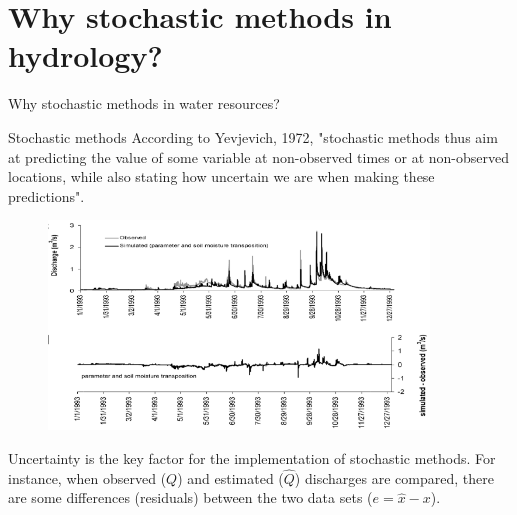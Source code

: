\documentclass[8pt]{beamer}
\begin{document}
\section{Why stochastic methods in hydrology?}
\begin{frame}{Why stochastic methods in water resources?}

    \begin{block}{Stochastic methods}
    According to Yevjevich, 1972, "stochastic methods thus aim at predicting the value of some variable at non-observed times or at non-observed locations, while also stating how uncertain we are when making these predictions".
    \begin{figure}
    \centering
    \includegraphics[width=0.9\textwidth]{fi4l1.png}
    \end{figure}
    \vspace{-0.5cm}
    \alert{Uncertainty} is the key factor for the implementation of stochastic methods.  For instance, when observed ($Q$) and estimated ($\hat{Q}$) discharges are compared, there are some differences (\alert{residuals}) between the two data sets ($e = \hat{x}-x$). 
\end{block}
\end{frame}
\end{document}
